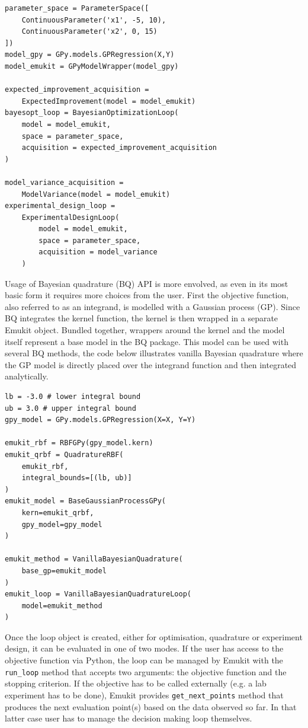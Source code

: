 \begin{verbatim}
parameter_space = ParameterSpace([
    ContinuousParameter('x1', -5, 10),
    ContinuousParameter('x2', 0, 15)
])
model_gpy = GPy.models.GPRegression(X,Y)
model_emukit = GPyModelWrapper(model_gpy)

expected_improvement_acquisition =
    ExpectedImprovement(model = model_emukit)
bayesopt_loop = BayesianOptimizationLoop(
    model = model_emukit,
    space = parameter_space,
    acquisition = expected_improvement_acquisition
)

model_variance_acquisition =
    ModelVariance(model = model_emukit)
experimental_design_loop =
    ExperimentalDesignLoop(
        model = model_emukit,
        space = parameter_space,
        acquisition = model_variance
    )
\end{verbatim}

Usage of Bayesian quadrature (BQ) API is more envolved, as even in its most basic form it requires more choices from the user. First the objective function, also referred to as an integrand, is modelled with a Gaussian process (GP). Since BQ integrates the kernel function, the kernel is then wrapped in a separate Emukit object. Bundled together, wrappers around the kernel and the model itself represent a base model in the BQ package. This model can be used with several BQ methods, the code below illustrates vanilla Bayesian quadrature where the GP model is directly placed over the integrand function and then integrated analytically.

\begin{verbatim}
lb = -3.0 # lower integral bound
ub = 3.0 # upper integral bound
gpy_model = GPy.models.GPRegression(X=X, Y=Y)

emukit_rbf = RBFGPy(gpy_model.kern)
emukit_qrbf = QuadratureRBF(
    emukit_rbf,
    integral_bounds=[(lb, ub)]
)
emukit_model = BaseGaussianProcessGPy(
    kern=emukit_qrbf,
    gpy_model=gpy_model
)

emukit_method = VanillaBayesianQuadrature(
    base_gp=emukit_model
)
emukit_loop = VanillaBayesianQuadratureLoop(
    model=emukit_method
)
\end{verbatim}

Once the loop object is created, either for optimisation, quadrature or experiment design, it can be evaluated in one of two modes. If the user has access to the objective function via Python, the loop can be managed by Emukit with the \texttt{run\_loop} method that accepts two arguments: the objective function and the stopping criterion. If the objective has to be called externally (e.g. a lab experiment has to be done), Emukit provides \texttt{get\_next\_points} method that produces the next evaluation point(s) based on the data observed so far. In that latter case user has to manage the decision making loop themselves.

